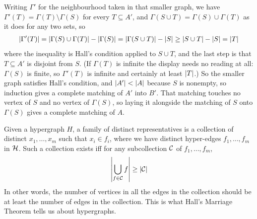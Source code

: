 \begin{iffproof}
\begin{itemize}
            Writing $\Gamma'$ for the neighbourhood taken in that smaller graph, we have $\Gamma'(T) = \Gamma(T) \setminus \Gamma(S)$ for every $T \subseteq A'$, and $\Gamma(S \cup T) = \Gamma(S) \cup \Gamma(T)$ as it does for any two sets, so
            \begin{align*}
                \left\lvert \Gamma'(T) \right\rvert = \left\lvert \Gamma(S) \cup \Gamma(T) \right\rvert - \left\lvert \Gamma(S) \right\rvert = \left\lvert \Gamma(S \cup T) \right\rvert - \left\lvert S \right\rvert \geq \left\lvert S \cup T \right\rvert - \left\lvert S \right\rvert = \left\lvert T \right\rvert
            \end{align*}
            where the inequality is Hall's condition applied to $S \cup T$, and the last step is that $T \subseteq A'$ is disjoint from $S$. (If $\Gamma(T)$ is infinite the display needs no reading at all: $\Gamma(S)$ is finite, so $\Gamma'(T)$ is infinite and certainly at least $\left\lvert T \right\rvert$.) So the smaller graph satisfies Hall's condition, and $\left\lvert A' \right\rvert < \left\lvert A \right\rvert$ because $S$ is nonempty, so induction gives a complete matching of $A'$ into $B'$. That matching touches no vertex of $S$ and no vertex of $\Gamma(S)$, so laying it alongside the matching of $S$ onto $\Gamma(S)$ gives a complete matching of $A$.
    \end{itemize}
\end{iffproof}

Given a hypergraph $H$, a family of distinct representatives is a collection of distinct $x_1, \ldots, x_m$ such that $x_i \in f_i$, where we have distinct hyper-edges $f_1, \ldots, f_m$ in $\mathcal{H}$. Such a collection exists iff for any subcollection $\mathcal{C}$ of $f_1, \ldots, f_m$,
\begin{align*}
    \left\lvert \bigcup_{f \in \mathcal{C}} f \right\rvert \geq \left\lvert \mathcal{C} \right\rvert
\end{align*}
In other words, the number of vertices in all the edges in the collection should be at least the number of edges in the collection. This is what Hall's Marriage Theorem tells us about hypergraphs.

